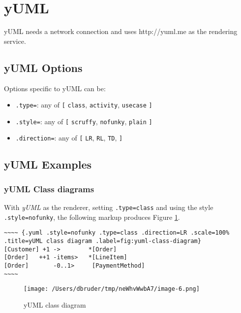 \documentclass[]{article}
\begin{document}
\newpage

\section{yUML}\label{yuml}

yUML needs a network connection and uses http://yuml.me as the rendering
service.

\subsection{yUML Options}\label{yuml-options}

Options specific to yUML can be:

\begin{itemize}
\itemsep1pt\parskip0pt
\item
  \texttt{.type=}: any of \texttt{{[}} \texttt{class},
  \texttt{activity}, \texttt{usecase} \texttt{{]}}
\item
  \texttt{.style=}: any of \texttt{{[}} \texttt{scruffy},
  \texttt{nofunky}, \texttt{plain} \texttt{{]}}
\item
  \texttt{.direction=}: any of \texttt{{[}} \texttt{LR}, \texttt{RL},
  \texttt{TD}, \texttt{{]}}
\end{itemize}

\subsection{yUML Examples}\label{yuml-examples}

\subsubsection{yUML Class diagrams}\label{yuml-class-diagrams}

With \emph{yUML} as the renderer, setting \texttt{.type=class} and using
the style \texttt{.style=nofunky}, the following markup produces Figure
\ref{fig:yuml-class-diagram}.

\scriptsize

\begin{verbatim}
~~~~ {.yuml .style=nofunky .type=class .direction=LR .scale=100% .title=yUML class diagram .label=fig:yuml-class-diagram}
[Customer] +1 ->        *[Order]
[Order]   ++1 -items>   *[LineItem]
[Order]       -0..1>     [PaymentMethod]
~~~~
\end{verbatim}

\normalsize

\begin{figure}[htbp]
\centering
\texttt{[image: /Users/dbruder/tmp/neWhvWwbA7/image-6.png]}
\caption{yUML class diagram\label{fig:yuml-class-diagram}}
\end{figure}
\end{document}
